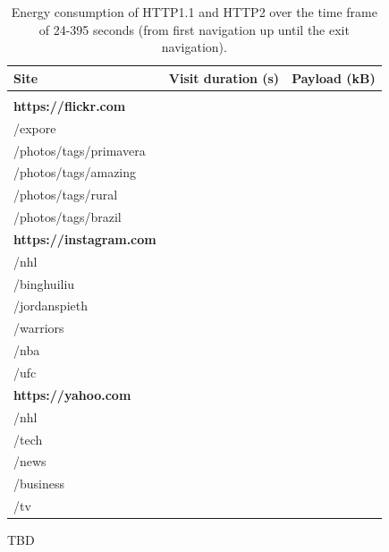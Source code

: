 \documentclass{article}
\begin{document}
\begin{table}[h!]

    \begin{tabular}{lll}
        \textbf{Site} & \textbf{Visit duration (s)} & \textbf{Payload (kB)} \\
        \hline \vspace{-3mm}\\
        \textbf{https://flickr.com} \\
        \hspace{1em} /expore \\
        \hspace{1em} /photos/tags/primavera \\
        \hspace{1em} /photos/tags/amazing \\
        \hspace{1em} /photos/tags/rural \\
        \hspace{1em} /photos/tags/brazil \vspace{1mm}\\
        \textbf{https://instagram.com} \\
        \hspace{1em} /nhl \\
        \hspace{1em} /binghuiliu \\
        \hspace{1em} /jordanspieth \\
        \hspace{1em} /warriors \\
        \hspace{1em} /nba \\
        \hspace{1em} /ufc \vspace{1mm}\\
        \textbf{https://yahoo.com} \\
        \hspace{1em} /nhl \\
        \hspace{1em} /tech \\
        \hspace{1em} /news \\
        \hspace{1em} /business \\
        \hspace{1em} /tv \vspace{1mm}\\
    \end{tabular}
    \caption{Energy consumption of HTTP1.1 and HTTP2 over the time frame of 24-395 seconds (from first navigation up until the exit navigation).}
    \label{table:url_manifest}
\end{table}
TBD
\end{document}
